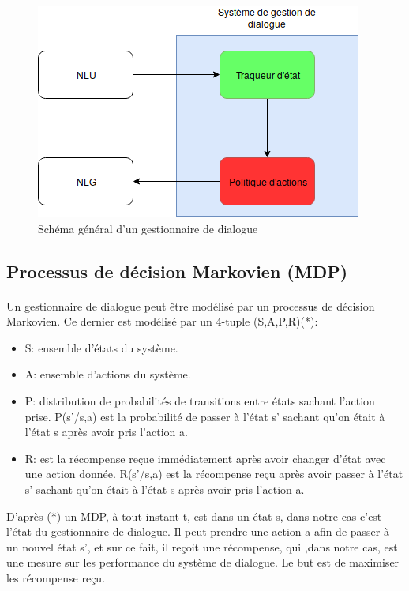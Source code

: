 \begin{figure}[H]
	\centering
	\includegraphics[width=.7\linewidth]{images/DM/DMGeneral.png} 
	\caption{Schéma général d'un gestionnaire de dialogue} 
\end{figure}


	\subsection{Processus de décision Markovien (MDP)}\label{MDP}
	\paragraph{}Un gestionnaire de dialogue peut être modélisé par un processus de décision Markovien\cite{Bel1957}. Ce dernier est modélisé par un 4-tuple (S,A,P,R)(*):
	\begin{itemize}
		\item S: ensemble d’états du système.
		\item A: ensemble d’actions du système.
		\item P: distribution de probabilités de transitions entre états sachant l’action prise. P(s’/s,a) est la probabilité de passer à l’état s’ sachant qu’on était à l’état s après avoir pris l’action a.
		\item R: est la récompense reçue immédiatement après avoir changer d’état avec une action donnée. R(s’/s,a) est la récompense reçu après avoir passer à l’état s’ sachant qu’on était à l’état s après avoir pris l’action a.
	\end{itemize}
	D’après (*) un MDP, à tout instant t, est dans un état s, dans notre cas c’est l’état du gestionnaire de dialogue. Il peut prendre une action a afin de passer à un nouvel état s’, et sur ce fait, il reçoit une récompense, qui ,dans notre cas, est une mesure sur les performance du système de dialogue. Le but est de maximiser les récompense reçu.
	
